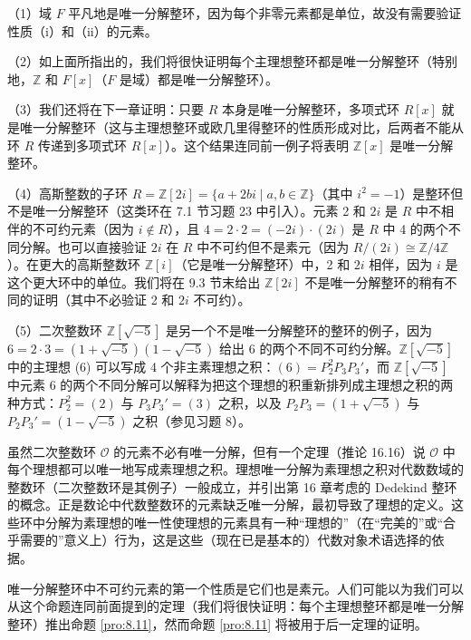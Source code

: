 \begin{example}
（1）域 \(F\) 平凡地是唯一分解整环，因为每个非零元素都是单位，故没有需要验证性质（i）和（ii）的元素。

（2）如上面所指出的，我们将很快证明每个主理想整环都是唯一分解整环（特别地，\(\mathbb{Z}\) 和 \(F[x]\)（\(F\) 是域）都是唯一分解整环）。

（3）我们还将在下一章证明：只要 \(R\) 本身是唯一分解整环，多项式环 \(R[x]\) 就是唯一分解整环（这与主理想整环或欧几里得整环的性质形成对比，后两者不能从环 \(R\) 传递到多项式环 \(R[x]\)）。这个结果连同前一例子将表明 \(\mathbb{Z}[x]\) 是唯一分解整环。

（4）高斯整数的子环 \(R = \mathbb{Z}[2i] = \{a + 2bi \mid a, b \in \mathbb{Z}\}\)（其中 \(i^2 = -1\)）是整环但不是唯一分解整环（这类环在 7.1 节习题 23 中引入）。元素 2 和 \(2i\) 是 \(R\) 中不相伴的不可约元素（因为 \(i \notin R\)），且 \(4 = 2 \cdot 2 = (-2i)\cdot(2i)\) 是 \(R\) 中 4 的两个不同分解。也可以直接验证 \(2i\) 在 \(R\) 中不可约但不是素元（因为 \(R/(2i) \cong \mathbb{Z}/4\mathbb{Z}\)）。在更大的高斯整数环 \(\mathbb{Z}[i]\)（它是唯一分解整环）中，2 和 \(2i\) 相伴，因为 \(i\) 是这个更大环中的单位。我们将在 9.3 节末给出 \(\mathbb{Z}[2i]\) 不是唯一分解整环的稍有不同的证明（其中不必验证 2 和 \(2i\) 不可约）。

（5）二次整数环 \(\mathbb{Z}[\sqrt{-5}]\) 是另一个不是唯一分解整环的整环的例子，因为 \(6 = 2\cdot 3 = (1+\sqrt{-5})(1-\sqrt{-5})\) 给出 6 的两个不同不可约分解。\(\mathbb{Z}[\sqrt{-5}]\) 中的主理想 (6) 可以写成 4 个非主素理想之积：\((6) = P_2^2P_3P_3'\)，而 \(\mathbb{Z}[\sqrt{-5}]\) 中元素 6 的两个不同分解可以解释为把这个理想的积重新排列成主理想之积的两种方式：\(P_2^2 = (2)\) 与 \(P_3P_3' = (3)\) 之积，以及 \(P_2P_3 = (1+\sqrt{-5})\) 与 \(P_2P_3' = (1-\sqrt{-5})\) 之积（参见习题 8）。

虽然二次整数环 \(\mathcal{O}\) 的元素不必有唯一分解，但有一个定理（推论 16.16）说 \(\mathcal{O}\) 中每个理想都可以唯一地写成素理想之积。理想唯一分解为素理想之积对代数数域的整数环（二次整数环是其例子）一般成立，并引出第 16 章考虑的 Dedekind 整环的概念。正是数论中代数整数环的元素缺乏唯一分解，最初导致了理想的定义。这些环中分解为素理想的唯一性使理想的元素具有一种“理想的”（在“完美的”或“合乎需要的”意义上）行为，这是这些（现在已是基本的）代数对象术语选择的依据。
\end{example}

唯一分解整环中不可约元素的第一个性质是它们也是素元。人们可能以为我们可以从这个命题连同前面提到的定理（我们将很快证明：每个主理想整环都是唯一分解整环）推出命题 \ref{pro:8.11}，然而命题 \ref{pro:8.11} 将被用于后一定理的证明。

